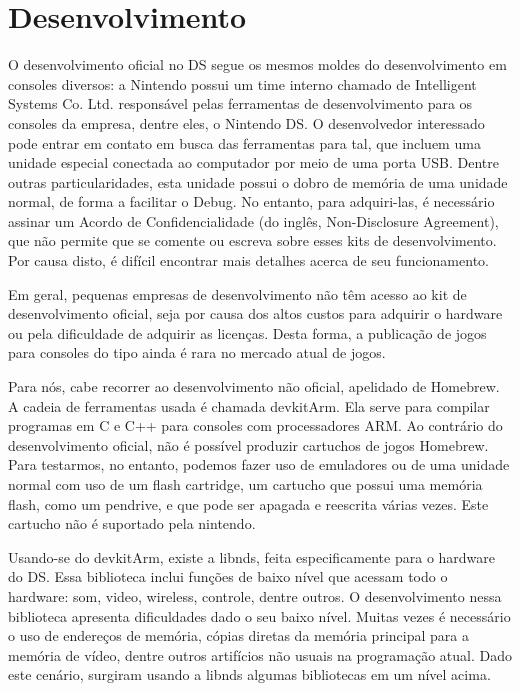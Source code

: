 \documentclass[brazil]{abnt}
\begin{document}
\section{Desenvolvimento}

O desenvolvimento oficial no DS segue os mesmos moldes do desenvolvimento em consoles diversos: a Nintendo possui um time interno chamado de Intelligent Systems Co. Ltd. responsável pelas ferramentas de desenvolvimento para os consoles da empresa, dentre eles, o Nintendo DS. O desenvolvedor interessado pode entrar em contato em busca das ferramentas para tal, que incluem uma unidade especial conectada ao computador por meio de uma porta USB. Dentre outras particularidades, esta unidade possui o dobro de memória de uma unidade normal, de forma a facilitar o Debug. No entanto, para adquiri-las, é necessário assinar um Acordo de Confidencialidade (do inglês, Non-Disclosure Agreement), que não permite que se comente ou escreva sobre esses kits de desenvolvimento. Por causa disto, é difícil encontrar mais detalhes acerca de seu funcionamento.

Em geral, pequenas empresas de desenvolvimento não têm acesso ao kit de desenvolvimento oficial, seja por causa dos altos custos para adquirir o hardware ou pela dificuldade de adquirir as licenças. Desta forma, a publicação de jogos para consoles do tipo ainda é rara no mercado atual de jogos.

Para nós, cabe recorrer ao desenvolvimento não oficial, apelidado de Homebrew. A cadeia de ferramentas usada é chamada devkitArm. Ela serve para compilar programas em C e C++ para consoles com processadores ARM. Ao contrário do desenvolvimento oficial, não é possível produzir cartuchos de jogos Homebrew. Para testarmos, no entanto, podemos fazer uso de emuladores ou de uma unidade normal com uso de um flash cartridge, um cartucho que possui uma memória flash, como um pendrive, e que pode ser apagada e reescrita várias vezes. Este cartucho não é suportado pela nintendo.

Usando-se do devkitArm, existe a libnds, feita especificamente para o hardware do DS. Essa biblioteca inclui funções de baixo nível que acessam todo o hardware: som, video, wireless, controle, dentre outros. O desenvolvimento nessa biblioteca apresenta dificuldades dado o seu baixo nível. Muitas vezes é necessário o uso de endereços de memória, cópias diretas da memória principal para a memória de vídeo, dentre outros artifícios não usuais na programação atual. Dado este cenário, surgiram usando a libnds algumas bibliotecas em um nível acima.
\end{document}
